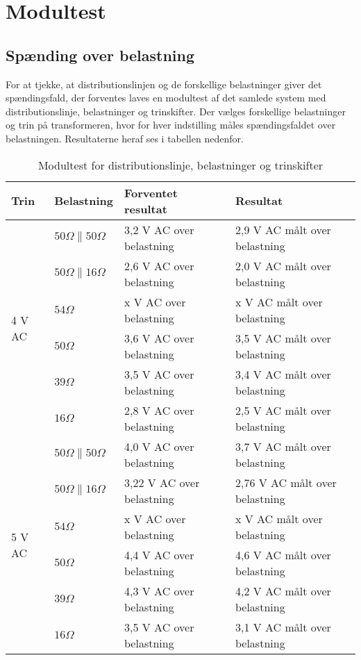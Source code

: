 

\section{Modultest}
\subsection{Spænding over belastning}
For at tjekke, at distributionslinjen og de forskellige belastninger giver det spændingsfald, der forventes laves en modultest af det samlede system med distributionslinje, belastninger og trinskifter. Der vælges forskellige belastninger og trin på transformeren, hvor for hver indstilling måles spændingsfaldet over belastningen. Resultaterne heraf ses i tabellen nedenfor. 


\begin{table}[H]
	\centering
	\begin{tabular}{|l|l|l|l|}
		\hline
		\textbf{Trin} & \textbf{Belastning} & \textbf{Forventet resultat} & \textbf{Resultat} \\\hline
		
		\multirow{6}{*}{4 V AC} 
		& $50 \Omega\parallel 50 \Omega$ & 3,2 V AC over belastning & 2,9 V AC målt over belastning \\\hhline{~---} 	
		& $50 \Omega\parallel 16 \Omega$ & 2,6 V AC over belastning & 2,0 V AC målt over belastning \\\hhline{~---}
		& $54 \Omega$ & x V AC over belastning & x V AC målt over belastning \\\hhline{~---} 
		& $50 \Omega$ & 3,6 V AC over belastning & 3,5 V AC målt over belastning \\\hhline{~---} 	
		& $39 \Omega$ & 3,5 V AC over belastning & 3,4 V AC målt over belastning \\\hhline{~---} 
		& $16 \Omega$ & 2,8 V AC over belastning & 2,5 V AC målt over belastning \\\hline 
	
		
		\multirow{6}{*}{5 V AC} 
		& $50 \Omega\parallel 50 \Omega$ & 4,0 V AC over belastning & 3,7 V AC målt over belastning \\\hhline{~---} 	
		& $50 \Omega\parallel 16 \Omega$ & 3,22 V AC over belastning & 2,76 V AC målt over belastning \\\hhline{~---}
		& $54 \Omega$ & x V AC over belastning & x V AC målt over belastning \\\hhline{~---} 
		& $50 \Omega$ & 4,4 V AC over belastning & 4,6 V AC målt over belastning \\\hhline{~---} 	
		& $39 \Omega$ & 4,3 V AC over belastning & 4,2 V AC målt over belastning \\\hhline{~---} 
		& $16 \Omega$ & 3,5 V AC over belastning & 3,1 V AC målt over belastning \\\hline
		
	\end{tabular}
	\caption{Modultest for distributionslinje, belastninger og trinskifter}
	\label{tab:Modultesttrin}
\end{table}

